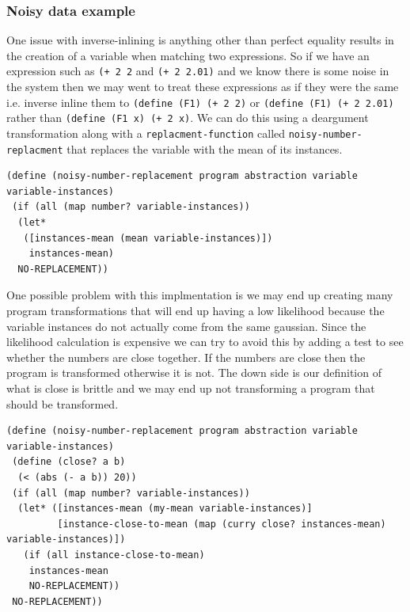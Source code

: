 \documentclass[a4paper,10pt]{article}
\begin{document}
\subsubsection{Noisy data example}
One issue with inverse-inlining is anything other than perfect equality results in the creation of a variable when matching two expressions.  So if we have an expression such as \texttt{(+ 2 2} and \texttt{(+ 2 2.01)} and we know there is some noise in the system then we may went to treat these expressions as if they were the same i.e. inverse inline them to \texttt{(define (F1) (+ 2 2)} or \texttt{(define (F1) (+ 2 2.01)} rather than \texttt{(define (F1 x) (+ 2 x)}.  We can do this using a deargument transformation along with a \texttt{replacment-function} called \texttt{noisy-number-replacment} that replaces the variable with the mean of its instances.  
\begin{verbatim}
(define (noisy-number-replacement program abstraction variable variable-instances)
 (if (all (map number? variable-instances))
  (let* 
   ([instances-mean (mean variable-instances)])
    instances-mean)
  NO-REPLACEMENT))
\end{verbatim}
One possible problem with this implmentation is we may end up creating many program transformations that will end up having a low likelihood because the variable instances do not actually come from the same gaussian.  Since the likelihood calculation is expensive we can try to avoid this by adding a test to see whether the numbers are close together.  If the numbers are close then the program is transformed otherwise it is not.  The down side is our definition of what is close is brittle and we may end up not transforming a program that should be transformed.
\begin{verbatim}
(define (noisy-number-replacement program abstraction variable variable-instances)
 (define (close? a b)
  (< (abs (- a b)) 20))
 (if (all (map number? variable-instances))
  (let* ([instances-mean (my-mean variable-instances)]
         [instance-close-to-mean (map (curry close? instances-mean) variable-instances)])
   (if (all instance-close-to-mean)
    instances-mean
    NO-REPLACEMENT))
 NO-REPLACEMENT))
\end{verbatim}
\end{document}

